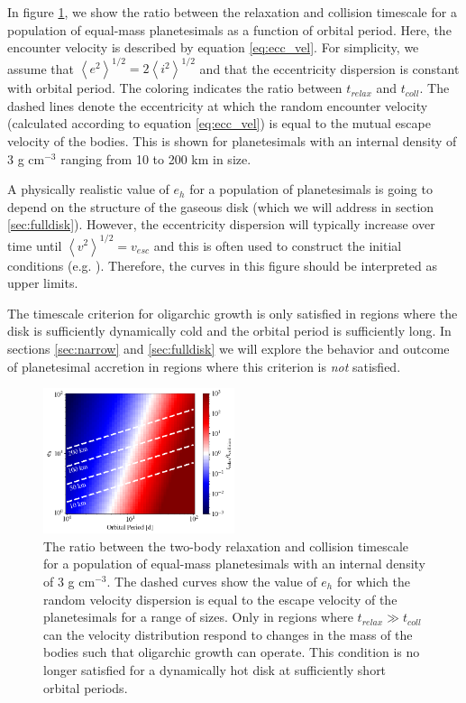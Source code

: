 \documentclass[twocolumn,linenumbers]{aastex63}
\begin{document}
In figure \ref{fig:timescales}, we show the ratio between the relaxation
and collision timescale for a population of equal-mass planetesimals
as a function of orbital period. Here, the encounter velocity is
described by equation \ref{eq:ecc_vel}. For
simplicity, we assume that $\left< e^2 \right>^{1/2} = 2\left< i^2
\right>^{1/2}$ \citep{ida93a} and that the eccentricity dispersion is
constant with orbital period. The coloring indicates the ratio between
$t_{relax}$ and $t_{coll}$. The dashed lines denote the eccentricity at which the
random encounter velocity (calculated according to equation \ref{eq:ecc_vel}) is
equal to the mutual escape velocity of the bodies. This is shown for planetesimals
with an internal density of 3 g cm$^{-3}$ ranging from 10 to 200 km in size.

A physically realistic value of $e_{h}$ for a population of planetesimals is going to depend on the structure
of the gaseous disk (which we will address in section \ref{sec:fulldisk}). However, the eccentricity
dispersion will typically increase over time until $\left< v^{2} \right>^{1/2} = v_{esc}$ and this is
often used to construct the initial conditions (e.g. \citet{barnes09}). Therefore, the curves in this figure
should be interpreted as upper limits.

The timescale criterion for oligarchic growth is only satisfied in regions where the
disk is sufficiently dynamically cold and the orbital period is
sufficiently long. In sections \ref{sec:narrow} and \ref{sec:fulldisk}
we will explore the behavior and outcome of planetesimal accretion in regions where this criterion is \textit{not} satisfied. 

\begin{figure}
\begin{center}
    \includegraphics[width=0.5\textwidth]{figures/timescales.png}
    \caption{The ratio between the two-body relaxation and collision
      timescale for a population of equal-mass planetesimals with an
      internal density of 3 g cm$^{-3}$. The dashed curves show 
      the value of $e_{h}$ for which the random velocity dispersion is equal
      to the escape velocity of the planetesimals for a range of sizes. Only
      in regions where $t_{relax} \gg t_{coll}$ can the velocity distribution 
      respond to changes in the mass of the bodies such that oligarchic 
      growth can operate. This condition is no longer satisfied for a 
      dynamically hot disk at sufficiently short orbital periods.\label{fig:timescales}}
\end{center}
\end{figure}
\end{document}
